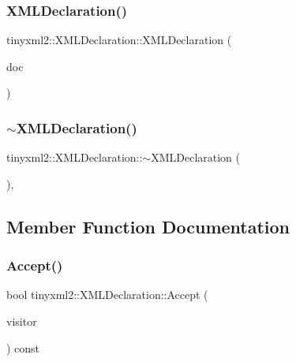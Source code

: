 \subsubsection{\texorpdfstring{X\+M\+L\+Declaration()}{XMLDeclaration()}}
{\footnotesize\ttfamily tinyxml2\+::\+X\+M\+L\+Declaration\+::\+X\+M\+L\+Declaration (\begin{DoxyParamCaption}\item[{\mbox{\hyperlink{classtinyxml2_1_1_x_m_l_document}{X\+M\+L\+Document}} $\ast$}]{doc }\end{DoxyParamCaption})\hspace{0.3cm}{\ttfamily [protected]}}

\mbox{\label{classtinyxml2_1_1_x_m_l_declaration_ab93d5bf4f5d58b4144963cf739cf6dcc}} 
\subsubsection{\texorpdfstring{$\sim$\+X\+M\+L\+Declaration()}{~XMLDeclaration()}}
{\footnotesize\ttfamily tinyxml2\+::\+X\+M\+L\+Declaration\+::$\sim$\+X\+M\+L\+Declaration (\begin{DoxyParamCaption}{ }\end{DoxyParamCaption})\hspace{0.3cm}{\ttfamily [protected]}, {\ttfamily [virtual]}}



\subsection{Member Function Documentation}
\mbox{\label{classtinyxml2_1_1_x_m_l_declaration_acf47629d9fc08ed6f1c164a97bcf794b}} 
\subsubsection{\texorpdfstring{Accept()}{Accept()}}
{\footnotesize\ttfamily bool tinyxml2\+::\+X\+M\+L\+Declaration\+::\+Accept (\begin{DoxyParamCaption}\item[{\mbox{\hyperlink{classtinyxml2_1_1_x_m_l_visitor}{X\+M\+L\+Visitor}} $\ast$}]{visitor }\end{DoxyParamCaption}) const\hspace{0.3cm}{\ttfamily [virtual]}}

